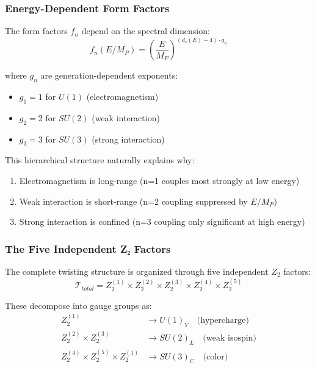 \subsubsection{Energy-Dependent Form Factors}

The form factors $f_n$ depend on the spectral dimension:
\begin{equation}
    f_n(E/M_P) = \left(\frac{E}{M_P}\right)^{(d_s(E) - 4) \cdot g_n}
\end{equation}

where $g_n$ are generation-dependent exponents:
\begin{itemize}
    \item $g_1 = 1$ for $U(1)$ (electromagnetism)
    \item $g_2 = 2$ for $SU(2)$ (weak interaction)
    \item $g_3 = 3$ for $SU(3)$ (strong interaction)
\end{itemize}

This hierarchical structure naturally explains why:
\begin{enumerate}
    \item Electromagnetism is long-range (n=1 couples most strongly at low energy)
    \item Weak interaction is short-range (n=2 coupling suppressed by $E/M_P$)
    \item Strong interaction is confined (n=3 coupling only significant at high energy)
\end{enumerate}

\subsubsection{The Five Independent Z₂ Factors}

The complete twisting structure is organized through five independent $Z_2$ factors:
\begin{equation}
    \mathcal{T}_{total} = Z_2^{(1)} \times Z_2^{(2)} \times Z_2^{(3)} \times Z_2^{(4)} \times Z_2^{(5)}
\end{equation}

These decompose into gauge groups as:
\begin{align}
    Z_2^{(1)} &\to U(1)_Y \quad \text{(hypercharge)} \\
    Z_2^{(2)} \times Z_2^{(3)} &\to SU(2)_L \quad \text{(weak isospin)} \\
    Z_2^{(4)} \times Z_2^{(5)} \times Z_2^{(1)} &\to SU(3)_C \quad \text{(color)}
\end{align}

